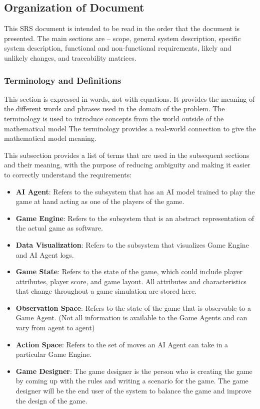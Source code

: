 \documentclass[12pt]{article}
\begin{document}
\noindent 

\subsection{Organization of Document}

This SRS document is intended to be read in the order that the document is presented. The main sections are – scope, general system description, specific system description, functional and non-functional requirements, likely and unlikely changes, and traceability matrices.

\subsubsection{Terminology and  Definitions}
This section is expressed in words, not with equations.  It provides the meaning of the different words and phrases used in the domain of the problem.
The terminology is used to introduce concepts from the world outside of the
mathematical model  The terminology provides a real-world connection to give the
mathematical model meaning.

This subsection provides a list of terms that are used in the subsequent
sections and their meaning, with the purpose of reducing ambiguity and making it
easier to correctly understand the requirements:

\begin{itemize}

\item \textbf{AI Agent}: Refers to the subsystem that has an AI model trained to play the game at hand acting as one of the players of the game.

\item \textbf{Game Engine}: Refers to the subsystem that is an abstract representation of the actual game as software.

\item \textbf{Data Visualization}: Refers to the subsystem that visualizes Game Engine and AI Agent logs.

\item \textbf{Game State}: Refers to the state of the game, which could include player attributes, player score, and game layout. All attributes and characteristics that change throughout a game simulation are stored here.

\item \textbf{Observation Space}: Refers to the state of the game that is observable to a Game Agent. (Not all information is available to the Game Agents and can vary from agent to agent)

\item \textbf{Action Space}: Refers to the set of moves an AI Agent can take in a particular Game Engine.

\item \textbf{Game Designer}: The game designer is the person who is creating the game by coming up with the rules and writing a scenario for the game. The game designer will be the end user of the system to balance the game and improve the design of the game.

\end{itemize}
\end{document}
